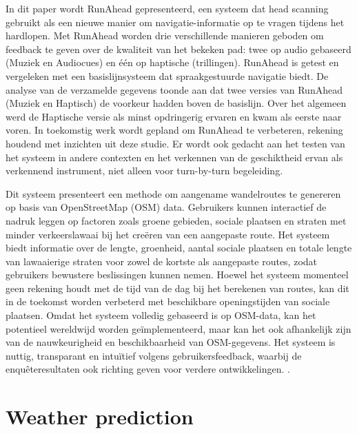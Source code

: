     \hspace{2cm}

    \textcite{Gallo2020} 
    In dit paper wordt RunAhead gepresenteerd, 
    een systeem dat head scanning gebruikt als een nieuwe manier om navigatie-informatie op te vragen tijdens het hardlopen. 
    Met RunAhead worden drie verschillende manieren geboden om feedback te geven over de kwaliteit van het bekeken pad: 
    twee op audio gebaseerd (Muziek en Audiocues) en één op haptische (trillingen). 
    RunAhead is getest en vergeleken met een basislijnsysteem dat spraakgestuurde navigatie biedt. 
    De analyse van de verzamelde gegevens toonde aan dat twee versies van RunAhead (Muziek en Haptisch) de voorkeur hadden boven de basislijn. 
    Over het algemeen werd de Haptische versie als minst opdringerig ervaren en kwam als eerste naar voren. 
    In toekomstig werk wordt gepland om RunAhead te verbeteren, rekening houdend met inzichten uit deze studie. 
    Er wordt ook gedacht aan het testen van het systeem in andere contexten en het verkennen van de geschiktheid ervan als verkennend instrument, 
    niet alleen voor turn-by-turn begeleiding.

    \hspace{2cm}

    \textcite{Novack2018} 
    Dit systeem presenteert een methode om aangename wandelroutes te genereren op basis van OpenStreetMap (OSM) data. 
    Gebruikers kunnen interactief de nadruk leggen op factoren zoals groene gebieden, 
    sociale plaatsen en straten met minder verkeerslawaai bij het creëren van een aangepaste route. 
    Het systeem biedt informatie over de lengte, groenheid, aantal sociale plaatsen en totale lengte van lawaaierige straten 
    voor zowel de kortste als aangepaste routes, zodat gebruikers bewustere beslissingen kunnen nemen. 
    Hoewel het systeem momenteel geen rekening houdt met de tijd van de dag bij het berekenen van routes, 
    kan dit in de toekomst worden verbeterd met beschikbare openingstijden van sociale plaatsen. 
    Omdat het systeem volledig gebaseerd is op OSM-data, kan het potentieel wereldwijd worden geïmplementeerd, 
    maar kan het ook afhankelijk zijn van de nauwkeurigheid en beschikbaarheid van OSM-gegevens. 
    Het systeem is nuttig, transparant en intuïtief volgens gebruikersfeedback, 
    waarbij de enquêteresultaten ook richting geven voor verdere ontwikkelingen.
    \autocite{Novack2018}.

    \section{Weather prediction}

